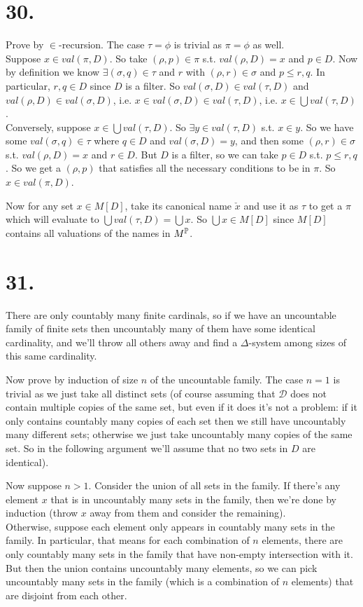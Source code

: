 \documentclass[a4paper]{article}
\begin{document}
\section*{30.}
Prove by $\in$-recursion. The case $\tau=\phi$ is trivial as $\pi=\phi$ as well.\\
Suppose $x \in val(\pi,D)$. So take $(\rho,p) \in \pi$ s.t. $val(\rho,D) = x$ and $p \in D$. Now by definition we know $\exists (\sigma,q) \in \tau$ and $r$ with $(\rho,r) \in \sigma$ and $p \leq r,q$. In particular, $r,q \in D$ since $D$ is a filter. So $val(\sigma,D) \in val(\tau,D)$ and $val(\rho,D) \in val(\sigma,D)$, i.e. $x \in val(\sigma,D) \in val(\tau,D)$, i.e. $x \in \bigcup val(\tau,D)$.\\
Conversely, suppose $x \in \bigcup val(\tau,D)$. So $\exists y \in val(\tau,D)$ s.t. $x \in y$. So we have some $val(\sigma,q) \in \tau$ where $q \in D$ and $val(\sigma,D) = y$, and then some $(\rho,r) \in \sigma$ s.t. $val(\rho,D) = x$ and $r \in D$. But $D$ is a filter, so we can take $p \in D$ s.t. $p \leq r,q$. So we get a $(\rho,p)$ that satisfies all the necessary conditions to be in $\pi$. So $x \in val(\pi,D)$.

Now for any set $x \in M[D]$, take its canonical name $\check{x}$ and use it as $\tau$ to get a $\pi$ which will evaluate to $\bigcup val(\tau,D) = \bigcup x$. So $\bigcup x \in M[D]$ since $M[D]$ contains all valuations of the names in $M^\P$.

\section*{31.}
There are only countably many finite cardinals, so if we have an uncountable family of finite sets then uncountably many of them have some identical cardinality, and we'll throw all others away and find a $\Delta$-system among sizes of this same cardinality.

Now prove by induction of size $n$ of the uncountable family. The case $n=1$ is trivial as we just take all distinct sets (of course assuming that $\mathcal{D}$ does not contain multiple copies of the same set, but even if it does it's not a problem: if it only contains countably many copies of each set then we still have uncountably many different sets; otherwise we just take uncountably many copies of the same set. So in the following argument we'll assume that no two sets in $D$ are identical).

Now suppose $n>1$. Consider the union of all sets in the family. If there's any element $x$ that is in uncountably many sets in the family, then we're done by induction (throw $x$ away from them and consider the remaining). \\
Otherwise, suppose each element only appears in countably many sets in the family. In particular, that means for each combination of $n$ elements, there are only countably many sets in the family that have non-empty intersection with it. But then the union contains uncountably many elements, so we can pick uncountably many sets in the family (which is a combination of $n$ elements) that are disjoint from each other.
\end{document}
